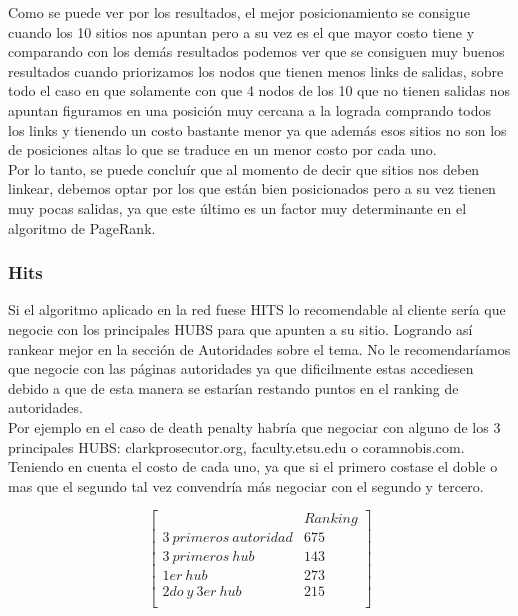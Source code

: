 Como se puede ver por los resultados, el mejor posicionamiento se consigue cuando los 10 sitios nos apuntan pero a su vez es el que mayor costo tiene y comparando con los demás resultados podemos ver que se consiguen muy buenos resultados cuando priorizamos los nodos que tienen menos links de salidas, sobre todo el caso en que solamente con que 4 nodos de los 10 que no tienen salidas nos apuntan figuramos en una posición muy cercana a la lograda comprando todos los links y tienendo un costo bastante menor ya que además esos sitios no son los de posiciones altas lo que se traduce en un menor costo por cada uno.\\
Por lo tanto, se puede concluír que al momento de decir que sitios nos deben linkear, debemos optar por los que están bien posicionados pero a su vez tienen muy pocas salidas, ya que este último es un factor muy determinante en el algoritmo de PageRank. 

\subsubsection{Hits}
Si el algoritmo aplicado en la red fuese HITS lo recomendable al cliente sería que negocie con los principales HUBS para que apunten a su sitio. Logrando así rankear mejor en la sección de Autoridades sobre el tema. 
No le recomendaríamos que negocie con las páginas autoridades ya que dificilmente estas accediesen debido a que de esta manera se estarían restando puntos en el ranking de autoridades.\\
Por ejemplo en el caso de death penalty habría que negociar con alguno de los 3 principales HUBS: clarkprosecutor.org, faculty.etsu.edu o coramnobis.com. Teniendo en cuenta el costo de cada uno, ya que si el primero costase el doble 
o mas que el segundo tal vez convendría más negociar con el segundo y tercero.

   $$ 
\begin{bmatrix}
              		            &      Ranking \\
 3\ primeros\ autoridad 		&   	675         \\
 3\ primeros\ hub				&     	143   \\
 1er\ hub 						& 		273 	\\
 2do\ y\ 3er\ hub 				& 		215 	\\
\end{bmatrix} 
$$

